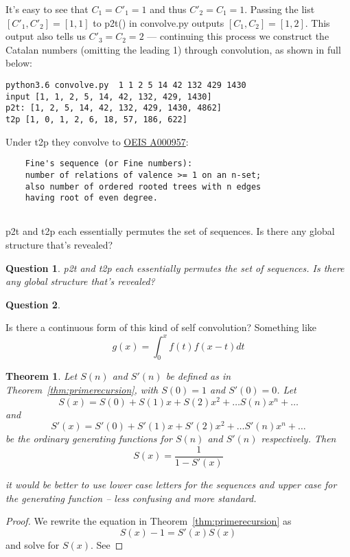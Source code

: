 \documentclass[10pt]{article}
\newtheorem{theorem}{Theorem}
\newtheorem{question}{Question}
\numberwithin{equation}{section}
\newenvironment{anote}
               {{\textcolor{blue}{Note:}}
                 \itshape
               }
               {}
\begin{document}
It's easy to see that $C_1=C'_1=1$ and thus $C'_2=C_1=1.$ Passing the list $[C'_1, C'_2]=[1,1]$ to p2t() in convolve.py outputs $[C_1, C_2]=[1,2]$. This output also tells us $C'_3=C_2=2$ — continuing this process we construct the Catalan numbers (omitting the leading 1) through convolution, as shown in full below:

\begin{verbatim}
python3.6 convolve.py  1 1 2 5 14 42 132 429 1430
input [1, 1, 2, 5, 14, 42, 132, 429, 1430]
p2t: [1, 2, 5, 14, 42, 132, 429, 1430, 4862]
t2p [1, 0, 1, 2, 6, 18, 57, 186, 622]
\end{verbatim}
 Under t2p they convolve to 
\href{https://oeis.org/A000957}{OEIS A000957}:
\begin{verbatim}
	Fine's sequence (or Fine numbers):
	number of relations of valence >= 1 on an n-set;
	also number of ordered rooted trees with n edges 
	having root of even degree. 
	
\end{verbatim}
p2t and t2p each essentially permutes the set of sequences. Is there any global structure that's revealed?

\begin{question}

p2t  and  t2p  each  essentially  permutes  the  set  of  sequences.   Is  there  any global structure that’s revealed?
\end{question}
\begin{question}

\end{question}
Is there a continuous form of this kind of self convolution? Something like
\begin{equation*}
    g(x) = \int_0^x f(t)f(x-t)dt
\end{equation*}

\begin{theorem}
Let $S(n)$ and $S'(n)$ be defined as in Theorem~\ref{thm:primerecursion}, with $S(0)=1$ and $S'(0)=0$. Let 
\begin{equation*}
    S(x)=S(0)+S(1)x+S(2)x^2 + \ldots S(n)x^n + \ldots
\end{equation*}
and 
\begin{equation*}
  S'(x)=S'(0)+S'(1)x+S'(2)x^2 + \ldots S'(n)x^n + \ldots  
\end{equation*}
be the ordinary generating functions for $S(n)$ and $S'(n)$ respectively. Then 
\begin{equation*}
    S(x) = \dfrac{1}{1-S'(x)}
\end{equation*}

\begin{anote}
it would be better to use lower case letters for the sequences and upper case for the generating function -- less confusing and more standard. 
\end{anote}
\end{theorem}
\begin{proof}
We rewrite the equation in Theorem~\ref{thm:primerecursion} as 
\begin{equation*}
    S(x)-1=S'(x)S(x)
\end{equation*}
and solve for $S(x)$. See
\end{proof}
\end{document}
